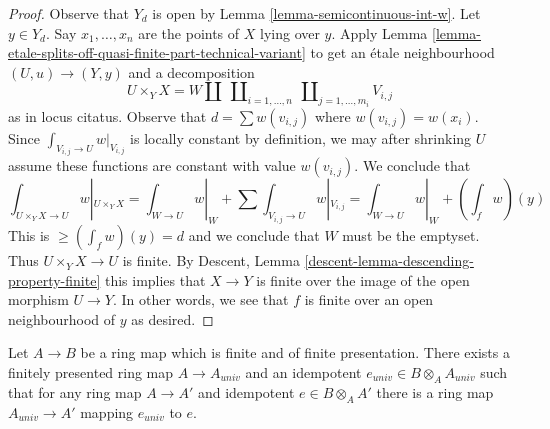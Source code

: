\begin{proof}
Observe that $Y_d$ is open by Lemma \ref{lemma-semicontinuous-int-w}.
Let $y \in Y_d$. Say $x_1, \ldots, x_n$ are the points of $X$
lying over $y$. Apply
Lemma \ref{lemma-etale-splits-off-quasi-finite-part-technical-variant}
to get an \'etale neighbourhood $(U, u) \to (Y, y)$ and a decomposition
$$
U \times_Y X =
W \amalg
\ \coprod\nolimits_{i = 1, \ldots, n}
\ \coprod\nolimits_{j = 1, \ldots, m_i}
V_{i, j}
$$
as in locus citatus. Observe that $d = \sum w(v_{i, j})$ where
$w(v_{i, j}) = w(x_i)$. Since $\int_{V_{i, j} \to U} w|_{V_{i, j}}$
is locally constant by definition, we may after shrinking $U$
assume these functions are constant with value $w(v_{i, j})$.
We conclude that
$$
\textstyle{\int}_{U \times_Y X \to U} w|_{U \times_Y X} =
\textstyle{\int}_{W \to U} w|_W +
\sum \textstyle{\int}_{V_{i, j} \to U} w|_{V_{i, j}} =
\textstyle{\int}_{W \to U} w|_W + (\int_f w)(y)
$$
This is $\geq (\int_f w)(y) = d$ and we conclude that $W$
must be the emptyset. Thus $U \times_Y X \to U$ is finite.
By Descent, Lemma \ref{descent-lemma-descending-property-finite}
this implies that $X \to Y$ is finite over
the image of the open morphism $U \to Y$. In other words,
we see that $f$ is finite over an open neighbourhood of $y$
as desired.
\end{proof}

\begin{lemma}
\label{lemma-open-and-closed-in-finite}
Let $A \to B$ be a ring map which is finite and of finite presentation.
There exists a finitely presented ring map $A \to A_{univ}$
and an idempotent $e_{univ} \in B \otimes_A A_{univ}$
such that for any ring map $A \to A'$ and idempotent $e \in B \otimes_A A'$
there is a ring map $A_{univ} \to A'$ mapping $e_{univ}$ to $e$.
\end{lemma}

